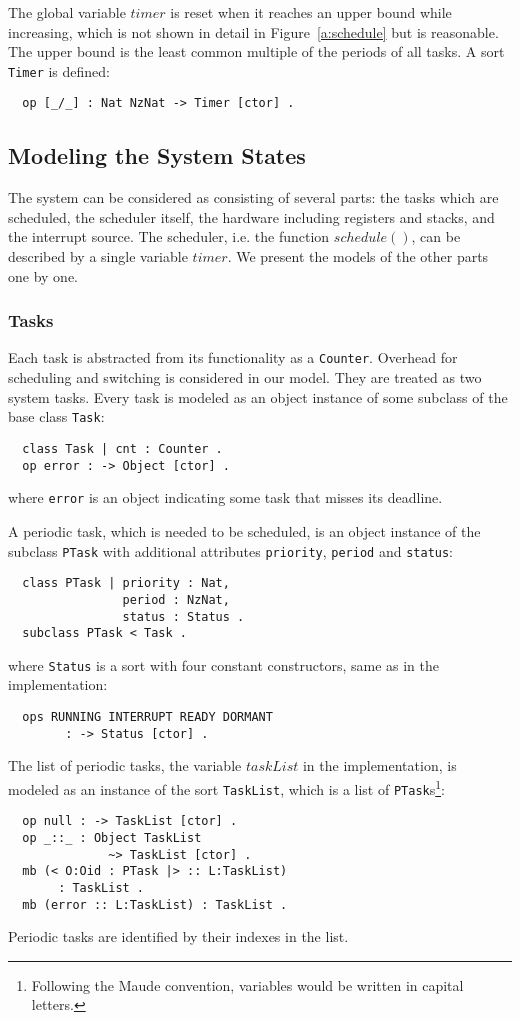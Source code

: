 \documentclass[10pt,journal,compsoc]{IEEEtran}
\begin{document}
The global variable $timer$ is reset when it reaches an upper bound
while increasing, which is not shown in detail in
Figure~\ref{a:schedule} but is reasonable. The upper bound is the
least common multiple of the periods of all tasks. A sort \verb|Timer|
is defined:
\begin{verbatim}
  op [_/_] : Nat NzNat -> Timer [ctor] .
\end{verbatim}

\subsection{Modeling the System States}
The system can be considered as consisting of several parts: the tasks
which are scheduled, the scheduler itself, the hardware including
registers and stacks, and the interrupt source. The scheduler,
i.e. the function $schedule()$, can be described by a single variable
$timer$. We present the models of the other parts one by one.

\subsubsection{Tasks}
Each task is abstracted from its functionality as a \verb|Counter|.
Overhead for scheduling and switching is considered in our model. They
are treated as two system tasks. Every task is modeled as an object
instance of some subclass of the base class \verb|Task|:
\begin{verbatim}
  class Task | cnt : Counter .
  op error : -> Object [ctor] .
\end{verbatim}
where \verb|error| is an object indicating some task that misses its
deadline.

A periodic task, which is needed to be scheduled, is an object
instance of the subclass \verb|PTask| with additional attributes
\verb|priority|, \verb|period| and \verb|status|:
\begin{verbatim}
  class PTask | priority : Nat, 
                period : NzNat, 
                status : Status .
  subclass PTask < Task .
\end{verbatim}
where \verb|Status| is a sort with four constant constructors, same as
in the implementation:
\begin{verbatim}
  ops RUNNING INTERRUPT READY DORMANT 
        : -> Status [ctor] .
\end{verbatim}
The list of periodic tasks, the variable $taskList$ in the
implementation, is modeled as an instance of the sort \verb|TaskList|,
which is a list of \verb|PTask|s\footnote{Following the Maude
  convention, variables would be written in capital letters.}:
\begin{verbatim}
  op null : -> TaskList [ctor] .
  op _::_ : Object TaskList 
              ~> TaskList [ctor] .
  mb (< O:Oid : PTask |> :: L:TaskList) 
       : TaskList .
  mb (error :: L:TaskList) : TaskList .
\end{verbatim}
Periodic tasks are identified by their indexes in the list.
\end{document}
